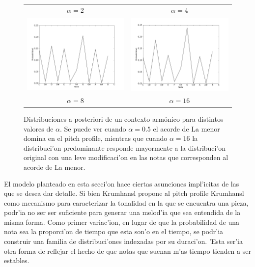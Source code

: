 \begin{figure}[htp]
\begin{center}
\begin{tabular}{cc}
        $\alpha=2$ & $\alpha=4$ \\
        \includegraphics[width=7.5cm]{images/posteriors/posterior-profile-8.png} &
        \includegraphics[width=7.5cm]{images/posteriors/posterior-profile-16.png} \\
        $\alpha=8$ & $\alpha=16$ \\

        \end{tabular}
        \caption{Distribuciones a posteriori de un contexto arm\'onico para distintos valores de $\alpha$. Se puede ver cuando $\alpha=0.5$ el acorde de La menor 
        domina en el pitch profile, mientras que cuando $\alpha=16$ la distribuci'on predominante responde mayormente a la distribuci'on original con una leve modificaci'on
        en las notas que corresponden al acorde de La menor.}
        \label{fig:pitch_posteriors}
    \end{center}      
\end{figure}

El modelo planteado en esta secci'on hace ciertas asunciones impl'icitas de las que se desea dar detalle. 
Si bien Krumhansl propone al pitch profile Krumhansl como mecanismo para caracterizar la tonalidad en la que se encuentra una pieza, 
podr'ia no ser ser suficiente para generar una melod'ia que sea entendida de la misma forma. 
Como primer variac'ion, en lugar de que la probabilidad de una nota sea la proporci'on de tiempo que esta son'o en el tiempo, 
se podr'ia construir una familia de distribuci'ones indexadas por su duraci'on. 'Esta ser'ia otra forma de reflejar el hecho de que notas que 
suenan m'as tiempo tienden a ser estables.


